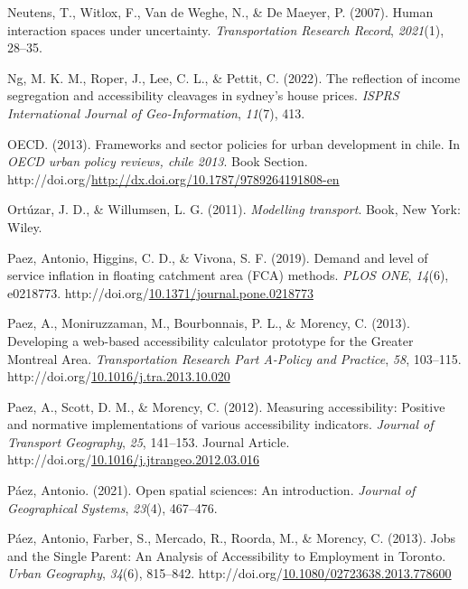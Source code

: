 \documentclass[
11pt, %
oneside, %
english, %
singlespacing, %
]{macthesis} %
\newlength{\cslhangindent}
\newenvironment{CSLReferences}[2] %
{\begin{list}{}{%
	\setlength{\itemindent}{0pt}
	\setlength{\leftmargin}{0pt}
	\setlength{\parsep}{0pt}
	\ifodd #1
	\setlength{\leftmargin}{\cslhangindent}
	\setlength{\itemindent}{-1\cslhangindent}
	\fi
	\setlength{\itemsep}{#2\baselineskip}}}
{\end{list}}
\begin{document}
\begin{CSLReferences}{1}{0}
Neutens, T., Witlox, F., Van de Weghe, N., \& De Maeyer, P. (2007). Human interaction spaces under uncertainty. \emph{Transportation Research Record}, \emph{2021}(1), 28--35.

Ng, M. K. M., Roper, J., Lee, C. L., \& Pettit, C. (2022). The reflection of income segregation and accessibility cleavages in sydney's house prices. \emph{ISPRS International Journal of Geo-Information}, \emph{11}(7), 413.

OECD. (2013). Frameworks and sector policies for urban development in chile. In \emph{OECD urban policy reviews, chile 2013}. Book Section. http://doi.org/\url{http://dx.doi.org/10.1787/9789264191808-en}

Ortúzar, J. D., \& Willumsen, L. G. (2011). \emph{Modelling transport}. Book, New York: Wiley.

Paez, Antonio, Higgins, C. D., \& Vivona, S. F. (2019). Demand and level of service inflation in floating catchment area ({FCA}) methods. \emph{{PLOS} {ONE}}, \emph{14}(6), e0218773. http://doi.org/\href{https://doi.org/10.1371/journal.pone.0218773}{10.1371/journal.pone.0218773}

Paez, A., Moniruzzaman, M., Bourbonnais, P. L., \& Morency, C. (2013). Developing a web-based accessibility calculator prototype for the {Greater} {Montreal} {Area}. \emph{Transportation Research Part A-Policy and Practice}, \emph{58}, 103--115. http://doi.org/\href{https://doi.org/10.1016/j.tra.2013.10.020}{10.1016/j.tra.2013.10.020}

Paez, A., Scott, D. M., \& Morency, C. (2012). Measuring accessibility: Positive and normative implementations of various accessibility indicators. \emph{Journal of Transport Geography}, \emph{25}, 141--153. Journal Article. http://doi.org/\href{https://doi.org/10.1016/j.jtrangeo.2012.03.016}{10.1016/j.jtrangeo.2012.03.016}

Páez, Antonio. (2021). Open spatial sciences: An introduction. \emph{Journal of Geographical Systems}, \emph{23}(4), 467--476.

Páez, Antonio, Farber, S., Mercado, R., Roorda, M., \& Morency, C. (2013). Jobs and the {Single} {Parent}: {An} {Analysis} of {Accessibility} to {Employment} in {Toronto}. \emph{Urban Geography}, \emph{34}(6), 815--842. http://doi.org/\href{https://doi.org/10.1080/02723638.2013.778600}{10.1080/02723638.2013.778600}


\end{CSLReferences}
\end{document}
